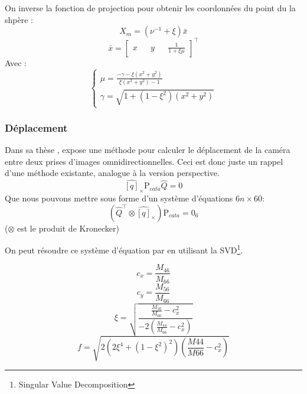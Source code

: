 On inverse la fonction de projection pour obtenir les coordonnées du point du la shpère :
\begin{equation}
X_m = (\nu^{-1} + \xi) \bar{x}
\end{equation}
\begin{equation}
\bar{x} = \begin{bmatrix}x && y && \frac{1}{1+\xi \mu} \end{bmatrix}^{\top}
\end{equation}
Avec :
\begin{equation}
  \left \{
  \begin{matrix}
    \mu = \frac{-\gamma-\xi(x^2+y^2)}{\xi(x^2+y^2)-1} \\
    \gamma = \sqrt{1+(1-\xi^2)(x^2+y^2)}
  \end{matrix}
 \right.
\end{equation}

\subsubsection{Déplacement}

Dans sa thèse \cite{Puig11PhD}, \citeauthor{Puig11PhD} expose une méthode pour calculer le déplacement de la caméra entre deux prises d'images omnidirectionnelles.
Ceci est donc juste un rappel d'une méthode existante, analogue à la version perspective.
\begin{equation}
\widehat{[q]}_\times \text{P}_{cata} \hat{Q} = 0
\end{equation}
Que nous pouvons mettre sous forme d'un système d'équations $6n\times60$:
\begin{equation}
\left( \hat{Q}^{\top} \otimes \widehat{[q]}_\times \right) \text{P}_{cata}  = 0_6
\end{equation}
($\otimes$ est le produit de Kronecker)

On peut résoudre ce système d'équation par  en utilisant la SVD\footnote{Singular Value Decomposition}.

\begin{equation}
c_x = \frac{M_{46}}{M_{66}}
\end{equation}
\begin{equation}
c_y = \frac{M_{56}}{M_{66}}
\end{equation}
\begin{equation}
\xi = \sqrt{\frac{\frac{M_{16}}{M_{66}}-c_x^2}{-2\left( \frac{M_{44}}{M_{66}}-c_x^2 \right)}}
\end{equation}
\begin{equation}
f = \sqrt{2\left(2\xi^4 + \left(1-\xi^2\right)^2\right)\left(\frac{M44}{M66}-c_x^2\right)}
\end{equation}

